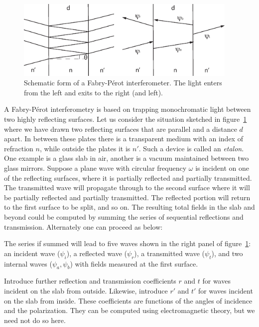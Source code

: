 \begin{figure}[h]
  \centering
	\includegraphics[width=0.95\textwidth]{fabry-perot-schematic.eps}
  \caption{Schematic form of a Fabry-P\'erot interferometer. The light enters from the 
left and exits to the right (and left).}
  \label{fig:fabry-perot-schematic}
\end{figure}

A Fabry-P\'erot interferometry is based on trapping monochromatic light between two
highly reflecting surfaces. Let us consider the situation sketched in figure~\ref{fig:fabry-perot-schematic} where we have drawn two reflecting surfaces that are parallel and a distance $d$ apart. In between these plates there is a transparent medium with an index of refraction $n$, while outside the plates it is $n'$. Such a device is called an {\it etalon}. One example is a glass slab in air, another is a vacuum maintained between two glass mirrors. Suppose a plane wave with circular frequency $\omega$ is incident on one of the reflecting surfaces, where it is partially reflected and partially transmitted. The transmitted wave will propagate through to the second surface where it will be partially reflected and partially transmitted. The reflected portion will return to the first surface to be split, and so on. The resulting total fields in the slab
and beyond could be computed by summing the series of sequential reflections and transmission. Alternately one can proceed as below:

The series if summed will lead to five waves shown in the right panel of figure~\ref{fig:fabry-perot-schematic}: an incident wave ($\psi_i$), a reflected wave
($\psi_r$),  a transmitted wave ($\psi_t$), and two internal waves ($\psi_a,\psi_b$) 
with fields measured at the first surface. 

Introduce further reflection and transmission coefficients $r$ and $t$ for waves incident
on the slab from outside. Likewise, introduce $r'$ and $t'$ for waves incident on the slab
from inside. These coefficients are functions of the angles of incidence and the polarization. They can be computed using electromagnetic theory, but we need not do so here. 

